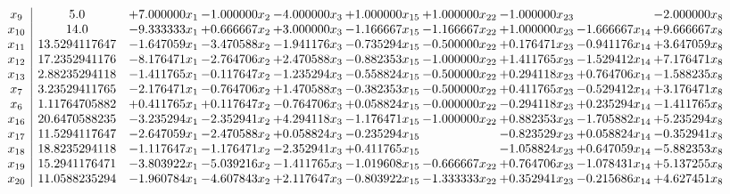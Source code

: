\documentclass[10pt]{article}
\begin{document}
 \[\begin{array}{c| c c@{\hskip 2pt} c@{\hskip 2pt} c@{\hskip 2pt} c@{\hskip 2pt} c@{\hskip 2pt} c@{\hskip 2pt} c@{\hskip 2pt} c@{\hskip 2pt} }
 x_{9}   &  5.0 & + 7.000000 x_{1} & -1.000000 x_{2} & -4.000000 x_{3} & + 1.000000 x_{15} & + 1.000000 x_{22} & -1.000000 x_{23} &   & -2.000000 x_{8}\\
 x_{10}   &  14.0 & -9.333333 x_{1} & + 0.666667 x_{2} & + 3.000000 x_{3} & -1.166667 x_{15} & -1.166667 x_{22} & + 1.000000 x_{23} & -1.666667 x_{14} & + 9.666667 x_{8}\\
 x_{11}   &  13.5294117647 & -1.647059 x_{1} & -3.470588 x_{2} & -1.941176 x_{3} & -0.735294 x_{15} & -0.500000 x_{22} & + 0.176471 x_{23} & -0.941176 x_{14} & + 3.647059 x_{8}\\
 x_{12}   &  17.2352941176 & -8.176471 x_{1} & -2.764706 x_{2} & + 2.470588 x_{3} & -0.882353 x_{15} & -1.000000 x_{22} & + 1.411765 x_{23} & -1.529412 x_{14} & + 7.176471 x_{8}\\
 x_{13}   &  2.88235294118 & -1.411765 x_{1} & -0.117647 x_{2} & -1.235294 x_{3} & -0.558824 x_{15} & -0.500000 x_{22} & + 0.294118 x_{23} & + 0.764706 x_{14} & -1.588235 x_{8}\\
 x_{7}   &  3.23529411765 & -2.176471 x_{1} & -0.764706 x_{2} & + 1.470588 x_{3} & -0.382353 x_{15} & -0.500000 x_{22} & + 0.411765 x_{23} & -0.529412 x_{14} & + 3.176471 x_{8}\\
 x_{6}   &  1.11764705882 & + 0.411765 x_{1} & + 0.117647 x_{2} & -0.764706 x_{3} & + 0.058824 x_{15} & -0.000000 x_{22} & -0.294118 x_{23} & + 0.235294 x_{14} & -1.411765 x_{8}\\
 x_{16}   &  20.6470588235 & -3.235294 x_{1} & -2.352941 x_{2} & + 4.294118 x_{3} & -1.176471 x_{15} & -1.000000 x_{22} & + 0.882353 x_{23} & -1.705882 x_{14} & + 5.235294 x_{8}\\
 x_{17}   &  11.5294117647 & -2.647059 x_{1} & -2.470588 x_{2} & + 0.058824 x_{3} & -0.235294 x_{15} &   & -0.823529 x_{23} & + 0.058824 x_{14} & -0.352941 x_{8}\\
 x_{18}   &  18.8235294118 & -1.117647 x_{1} & -1.176471 x_{2} & -2.352941 x_{3} & + 0.411765 x_{15} &   & -1.058824 x_{23} & + 0.647059 x_{14} & -5.882353 x_{8}\\
 x_{19}   &  15.2941176471 & -3.803922 x_{1} & -5.039216 x_{2} & -1.411765 x_{3} & -1.019608 x_{15} & -0.666667 x_{22} & + 0.764706 x_{23} & -1.078431 x_{14} & + 5.137255 x_{8}\\
 x_{20}   &  11.0588235294 & -1.960784 x_{1} & -4.607843 x_{2} & + 2.117647 x_{3} & -0.803922 x_{15} & -1.333333 x_{22} & + 0.352941 x_{23} & -0.215686 x_{14} & + 4.627451 x_{8}\\

\end{array}\]
\end{document}
